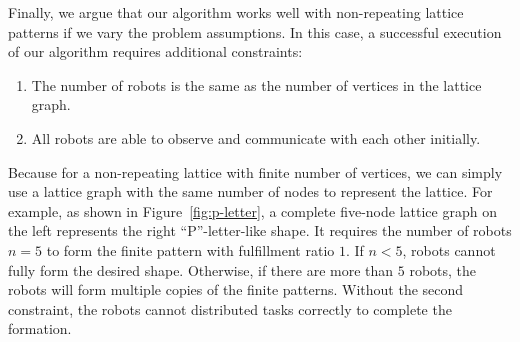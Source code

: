 Finally, we argue that our algorithm works well with non-repeating lattice patterns if we vary the problem assumptions.
%
In this case, a successful execution of our algorithm requires additional constraints: 
\begin{enumerate}
  \item The number of robots is the same as the number of vertices in the lattice graph.
  \item All robots are able to observe and communicate with each other initially.
\end{enumerate}
Because for a non-repeating lattice with finite number of vertices, 
we can simply use a lattice graph with the same number of nodes to represent the lattice.
%
For example, as shown in Figure~\ref{fig:p-letter}, a complete five-node lattice graph on the left represents the right ``P''-letter-like shape. 
%
It requires the number of robots $n=5$ to form the finite pattern with fulfillment ratio $1$.
If $n<5$, robots cannot fully form the desired shape. 
Otherwise, if there are more than $5$ robots, the robots will form multiple copies of the finite patterns. 
% 
Without the second constraint, the robots cannot distributed tasks correctly to complete the formation.

